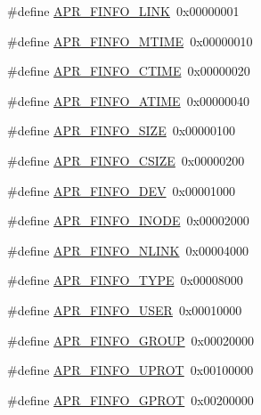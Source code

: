\begin{DoxyCompactItemize}
\item 
\#define \hyperlink{group__apr__file__stat_ga9b0c1d02401b845f928f836fdd3c6712}{A\+P\+R\+\_\+\+F\+I\+N\+F\+O\+\_\+\+L\+I\+NK}~0x00000001
\item 
\#define \hyperlink{group__apr__file__stat_ga992ce1f4f75d519fd2a9d241c5a12515}{A\+P\+R\+\_\+\+F\+I\+N\+F\+O\+\_\+\+M\+T\+I\+ME}~0x00000010
\item 
\#define \hyperlink{group__apr__file__stat_ga98bef78baf71fa63b06352704f128bca}{A\+P\+R\+\_\+\+F\+I\+N\+F\+O\+\_\+\+C\+T\+I\+ME}~0x00000020
\item 
\#define \hyperlink{group__apr__file__stat_ga17d7656d02a35ffc05afe22032a8da15}{A\+P\+R\+\_\+\+F\+I\+N\+F\+O\+\_\+\+A\+T\+I\+ME}~0x00000040
\item 
\#define \hyperlink{group__apr__file__stat_gadf72493da450c0b1e3d279e98a973120}{A\+P\+R\+\_\+\+F\+I\+N\+F\+O\+\_\+\+S\+I\+ZE}~0x00000100
\item 
\#define \hyperlink{group__apr__file__stat_gaf87a09b89935d730cb1ade80d5b6ada0}{A\+P\+R\+\_\+\+F\+I\+N\+F\+O\+\_\+\+C\+S\+I\+ZE}~0x00000200
\item 
\#define \hyperlink{group__apr__file__stat_ga0890d31145211f62d38dd8e444b5660a}{A\+P\+R\+\_\+\+F\+I\+N\+F\+O\+\_\+\+D\+EV}~0x00001000
\item 
\#define \hyperlink{group__apr__file__stat_ga4fee7341395912db501b40de81dbba26}{A\+P\+R\+\_\+\+F\+I\+N\+F\+O\+\_\+\+I\+N\+O\+DE}~0x00002000
\item 
\#define \hyperlink{group__apr__file__stat_gabb2ba05b8ed45e59b1f06e1b7b4c91c2}{A\+P\+R\+\_\+\+F\+I\+N\+F\+O\+\_\+\+N\+L\+I\+NK}~0x00004000
\item 
\#define \hyperlink{group__apr__file__stat_gad5d25f25527ee77c08bb20aae141306c}{A\+P\+R\+\_\+\+F\+I\+N\+F\+O\+\_\+\+T\+Y\+PE}~0x00008000
\item 
\#define \hyperlink{group__apr__file__stat_ga599d92111a5cca379a06980025044e12}{A\+P\+R\+\_\+\+F\+I\+N\+F\+O\+\_\+\+U\+S\+ER}~0x00010000
\item 
\#define \hyperlink{group__apr__file__stat_ga8420798139d34a88678498aa848803ff}{A\+P\+R\+\_\+\+F\+I\+N\+F\+O\+\_\+\+G\+R\+O\+UP}~0x00020000
\item 
\#define \hyperlink{group__apr__file__stat_gac85e4335fcf91881b11b3e8a4b224aca}{A\+P\+R\+\_\+\+F\+I\+N\+F\+O\+\_\+\+U\+P\+R\+OT}~0x00100000
\item 
\#define \hyperlink{group__apr__file__stat_gadfa294303e34528b1fcae1bc009140c1}{A\+P\+R\+\_\+\+F\+I\+N\+F\+O\+\_\+\+G\+P\+R\+OT}~0x00200000

\end{DoxyCompactItemize}
